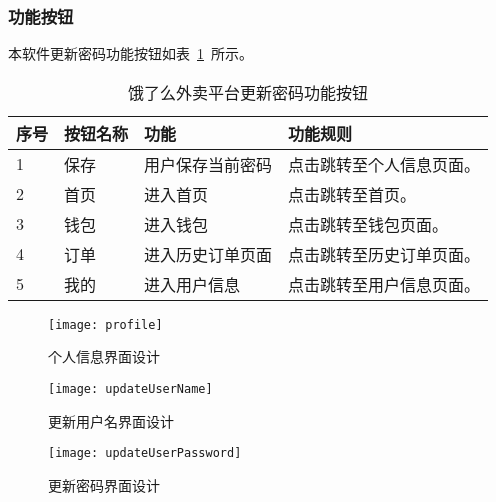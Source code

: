 \subsubsection{功能按钮}
本软件更新密码功能按钮如表~\ref{tab:table18}~所示。
\begin{table}[htbp]
    \caption{饿了么外卖平台更新密码功能按钮}\label{tab:table18}
    \vspace{0.5em}\wuhao
    \begin{tabularx}{\textwidth}{lllX}
    \toprule[1.5pt]
    序号 & 按钮名称 & 功能 & 功能规则 \\ 
    \midrule[1pt]
    1 & 保存 & 用户保存当前密码 & 点击跳转至个人信息页面。 \\
    2 & 首页 & 进入首页 & 点击跳转至首页。 \\
    3 & 钱包 & 进入钱包 & 点击跳转至钱包页面。 \\
    4 & 订单 & 进入历史订单页面 & 点击跳转至历史订单页面。 \\
    5 & 我的 & 进入用户信息 & 点击跳转至用户信息页面。 \\
\bottomrule[1.5pt]
\end{tabularx}
\vspace{\baselineskip}
\end{table}
\begin{figure}[htbp]
    \centering
    \begin{minipage}{0.4\textwidth}
    \centering
    \texttt{[image: profile]}
    \caption{个人信息界面设计}\label{fig:profile}
    \end{minipage}
    \begin{minipage}{0.4\textwidth}
    \centering
    \texttt{[image: updateUserName]}
    \caption{更新用户名界面设计}\label{fig:updateUserName}
    \end{minipage}
    \vspace{\baselineskip}
\end{figure}
\begin{figure}[htbp]
    \centering
    \texttt{[image: updateUserPassword]}
    \caption{更新密码界面设计}\label{fig:updateUserPassword}
    \vspace{\baselineskip}
\end{figure}